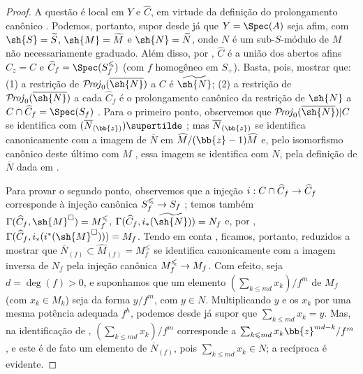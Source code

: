 \documentclass[oneside,10pt]{amsart}
\makeatletter
\renewcommand{\leq}{\leqslant}
\newcommand{\ega@arrow}[2]{\mathchoice{#1}{#2}{#2}{#2}}
\renewcommand{\to}{\ega@arrow{\longrightarrow}{\rightarrow}}
\def\shProj{\mathcal{P}\!\mathit{roj}}
\makeatother
\begin{document}
\begin{proof}
A questão é local em $Y$ e $\widehat{C}$, em virtude da definição do prolongamento canônico .
Podemos, portanto, supor desde já que $Y=\Spec(A)$ seja afim, com $\sh{S}=\widetilde{S}$, $\sh{M}=\widetilde{M}$ e $\sh{N}=\widetilde{N}$, onde $N$ é um sub-$S$-módulo de $M$ não necessariamente graduado.
Além disso, por , $\widehat{C}$ é a união dos abertos afins $\widehat{C}_z=C$ e $\widehat{C}_f=\Spec(S_f^\leq)$ (com $f$ homogêneo em $S_+$).
Basta, pois, mostrar que: (1) a restrição de $\shProj_0(\overline{\sh{N}})$ a $C$ é $\widetilde{\sh{N}}$; (2) a restrição de $\shProj_0(\overline{\sh{N}})$ a cada $\widehat{C}_f$ é o prolongamento canônico da restrição de $\sh{N}$ a $C\cap\widehat{C}_f=\Spec(S_f)$ .
Para o primeiro ponto, observemos que $\shProj_0(\overline{\sh{N}})|C$ se identifica com $(\overline{N}_{(\bb{z})})\supertilde$ ;
mas $\overline{N}_{(\bb{z})}$ se identifica canonicamente  com a imagem de $\overline{N}$ em $\widehat{M}/(\bb{z}-1)\widehat{M}$ e, pelo isomorfismo canônico deste último com $M$ , essa imagem se identifica com $N$, pela definição de $\overline{N}$ dada em .

Para provar o segundo ponto, observemos que a injeção $i:C\cap\widehat{C}_f\to\widehat{C}_f$ corresponde à injeção canônica $S_f^\leq\to S_f$ ;
temos também $\Gamma(\widehat{C}_f,\sh{M}^\square)=M_f^\leq$, $\Gamma(\widehat{C}_f,i_*(\widetilde{\sh{N}}))=N_f$ e, por , $\Gamma(\widehat{C}_f,i_*(i^*(\sh{M}^\square)))=M_f$.
Tendo em conta , ficamos, portanto, reduzidos a mostrar que $\overline{N}_{(f)}\subset\widehat{M}_{(f)}=M_f^\leq$ se identifica canonicamente com a imagem inversa de $N_f$ pela injeção canônica $M_f^\leq\to M_f$.
Com efeito, seja $d=\deg(f)>0$, e suponhamos que um elemento $(\sum_{k\leq md}x_k)/f^m$ de $M_f$ (com $x_k\in M_k$) seja da forma $y/f^m$, com $y\in N$.
Multiplicando $y$ e os $x_k$ por uma mesma potência adequada $f^h$, podemos desde já supor que $\sum_{k\leq md}x_k=y$.
Mas, na identificação de , $(\sum_{k\leq md}x_k)/f^m$ corresponde a $\sum_{k\leq md}x_k\bb{z}^{md-k}/f^m$, e este é de fato um elemento de $\overline{N}_{(f)}$, pois $\sum_{k\leq md}x_k\in N$;
a recíproca é evidente.
\end{proof}
\end{document}
